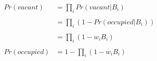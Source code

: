\documentclass[11pt,a4paper]{article}
\author{Michael Firman}
\begin{document}
\begin{align}
Pr(vacant) &= \prod_{i} Pr(vacant | B_i )\\
&\\
 &= \prod_{i} ( 1 - Pr(occupied | B_i ) ) \\
&\\
&= \prod_{i} ( 1 - w_iB_i )  \\
&\\
Pr(occupied) &= 1 - \prod_{i} ( 1 - w_iB_i ) \\
\end{align}
\end{document}
